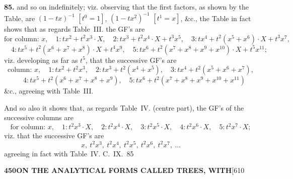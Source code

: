 \documentclass[11pt,a4paper]{article}
\begin{document}
{\noindent\textbf{85.}
and so on indefinitely; viz. observing that the first factors, as shown by the Table, are $(1-tx)^{-1}$ $[t^0=1]$, $(1-tx^2)^{-1}$ $[t^1=x]$, \&c., the Table in fact shows that as regards Table~III. the GF's are
\[
\text{for column: } x,\quad 1: tx^2 + t^2x^3 \cdot X,\quad 2: tx^3 + t^2x^4 \cdot X + t^3x^5,\quad 3: tx^4 + t^2(x^5 + x^6) \cdot X + t^3x^7,
\]
\[
\quad 4: tx^5 + t^2(x^6 + x^7 + x^8) \cdot X + t^4x^9,\quad 5: tx^6 + t^2(x^7 + x^8 + x^9 + x^{10}) \cdot X + t^5x^{11};
\]
viz. developing as far as $t^5$, that the successive GF's are
\[
\text{column: } x,\quad 1: tx^2 + t^2x^3,\quad 2: tx^3 + t^2(x^4 + x^5),\quad 3: tx^4 + t^2(x^5 + x^6 + x^7),
\]
\[
\quad 4: tx^5 + t^2(x^6 + x^7 + x^8 + x^9),\quad 5: tx^6 + t^2(x^7 + x^8 + x^9 + x^{10} + x^{11})
\]
\&c., agreeing with Table~III.

And so also it shows that, as regards Table~IV. (centre part), the GF's of the successive columns are
\[
\text{for column: } x,\quad 1: t^2x^3 \cdot X,\quad 2: t^2x^4 \cdot X,\quad 3: t^2x^5 \cdot X,\quad 4: t^2x^6 \cdot X,\quad 5: t^2x^7 \cdot X;
\]
viz. that the successive GF's are
\[
x,\ t^2x^3,\ t^2x^4,\ t^2x^5,\ t^2x^6,\ t^2x^7,\ \ldots
\]
agreeing in fact with Table~IV.
\hfill C.~IX.\ 85

\newpage
\noindent\textbf{450}\hspace{\fill}\textbf{ON THE ANALYTICAL FORMS CALLED TREES, WITH}\hspace{\fill}[610

}
\end{document}
